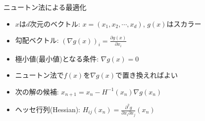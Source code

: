 \begin{frame}[t,fragile]{ニュートン法による最適化}
  \begin{itemize}
    \setlength{\itemsep}{1em}
  \item $x$は$d$次元のベクトル: $x = (x_1,x_2,\cdots,x_d)$, $g(x)$はスカラー
  \item 勾配ベクトル: $\displaystyle (\nabla g(x))_i = \frac{\partial g(x)}{\partial x_i}$
  \item 極小値(最小値)となる条件: $\nabla g(x)=0$
  \item ニュートン法で$f(x)$を$\nabla g(x)$で置き換えればよい
  \item 次の解の候補: $\displaystyle x_{n+1} = x_n - H^{-1}(x_n) \nabla g(x_n)$
  \item ヘッセ行列(Hessian): $\displaystyle H_{ij}(x_n) = \frac{\partial^2 g}{\partial x_i \partial x_j}(x_n)$
  \end{itemize}
\end{frame}
